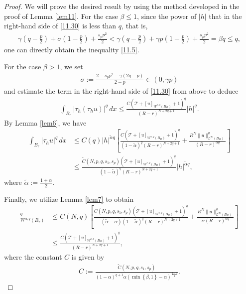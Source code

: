 \documentclass[reqno,10pt]{amsart}
\numberwithin{equation}{section}
\begin{document}
\begin{proof}
	We will prove the desired result by using the method developed in the proof of Lemma \ref{lem11}. For the case $\beta\le1$, since the power of $|h|$ that in the right-hand side of \eqref{11.30} is less than $q$, that is,
	\begin{align*}
		\gamma\left( q-\frac{p}{2}\right)+\sigma\left( 1-\frac{p}{2}\right)+\frac{s_pp^2}{2}<\gamma\left( q-\frac{p}{2}\right)+\gamma p\left( 1-\frac{p}{2}\right)+\frac{s_pp^2}{2}=\beta q\le q,
	\end{align*}
	one can directly obtain the inequality \eqref{11.5}.
	
	For the case $\beta>1$, we set
	\begin{align*}
		\sigma:=\frac{2-s_pp^2-\gamma(2q-p)}{2-p}\in (0,\gamma p)
	\end{align*}
	and estimate the term in the right-hand side of \eqref{11.30} from above to deduce
	\begin{align*}
		\int_{B_r}|\tau_h(\tau_hu)|^q\,dx\le \frac{C\left( \mathcal{T}+[u]_{W^{\gamma,q}(B_R)}+1\right)^q }{(R-r)^{N+2q+1}}|h|^q.
	\end{align*}
	By Lemma \eqref{lem6}, we have
	\begin{align*}
		\int_{B_r}|\tau_hu|^q\,dx&\le C(q)|h|^{\tilde{\alpha}q}\left[ \frac{C\left( \mathcal{T}+[u]_{W^{\gamma,q}(B_R)}+1\right)^q }{(1-\tilde{\alpha})^q(R-r)^{N+2q+1}}+\frac{R^N\|u\|^q_{L^\infty(B_R)}}{(R-r)^{\alpha q}}\right]\\
		&\le \frac{\widetilde{C}(N,p,q,s_1,s_p)\left( \mathcal{T}+[u]_{W^{\gamma,q}(B_R)}+1\right)^q}{(1-\tilde{\alpha})^q(R-r)^{N+2q+1}}|h|^{\tilde{\alpha}q},
	\end{align*}
	where $\tilde{\alpha}:=\frac{1+\alpha}{2}$.
	
	Finally, we utilize Lemma \ref{lem7} to obtain
	\begin{align*}
		[u]^q_{W^{\alpha,q}(B_r)}&\le C(N,q)\left[ \frac{C(N,p,q,s_1,s_p)\left( \mathcal{T}+[u]_{W^{\gamma,q}(B_R)}+1\right)^q}{(\tilde{\alpha}-\alpha)(1-\tilde{\alpha})^q(R-r)^{N+2q+1}}+\frac{R^N\|u\|^q_{L^\infty(B_R)}}{\alpha(R-r)^{\alpha q}}\right] \\
		&\le \frac{C\left( \mathcal{T}+[u]_{W^{\gamma,q}(B_R)}+1\right)^q}{(R-r)^{N+2q+1}},
	\end{align*}
	where the constant $C$ is given by
	\begin{align*}
		C:=\frac{\widetilde{C}(N,p,q,s_1,s_p)}{(1-\alpha)^{q+1}\alpha(\min\left\lbrace \beta,1\right\rbrace-\alpha )^{\frac{q-p}{q}}}.
	\end{align*}
\end{proof}
\end{document}
